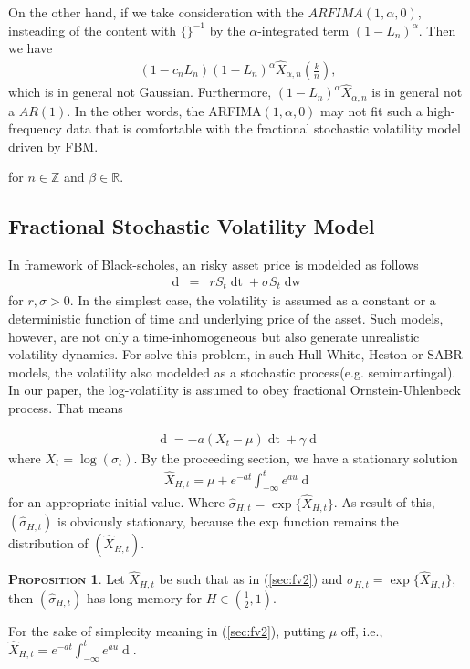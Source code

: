 \documentclass[a4paper, twoside, 11pt]{article}
\theoremstyle{definition}
\newtheorem{proposition}[definition]{\scshape Proposition}
\begin{document}
On the other hand, if we take consideration with the $ARFIMA(1, \alpha, 0)$, insteading of the content with $\{\}^{-1}$ by the $\alpha$-integrated term $(1-L_n)^\alpha$. Then we have
\begin{eqnarray*}
  (1-c_nL_n) (1-L_n)^\alpha \hat{X}_{\alpha,n}(\frac{k}{n}),
\end{eqnarray*}
which is in general not Gaussian. Furthermore, $(1-L_n)^\alpha \hat{X}_{\alpha,n}$ is in general not a $AR(1)$.  In the other words, the ARFIMA$(1, \alpha, 0)$ may not fit such a high-frequency data that is comfortable with the fractional stochastic volatility model driven by FBM. 


for $n \in \mathbb{Z}$ and $\beta \in \mathbb{R} $.
\subsection{Fractional Stochastic Volatility Model}
In framework of Black-scholes, an risky asset price is modelded as follows
\begin{eqnarray}
  \mathop{dS_t} &=& rS_t\mathop{dt} + \sigma S_t \mathop{dw}
\end{eqnarray}
for $r, \sigma > 0$. In the simplest case, the volatility is assumed as a constant or a deterministic function of time and underlying price of the asset. Such models, however, are not only a time-inhomogeneous but also generate unrealistic volatility dynamics. For solve this problem, in 
such  Hull-White, Heston or SABR models, the volatility also modelded as a stochastic process(e.g. semimartingal).\\
In our paper,  the log-volatility is assumed to obey fractional Ornstein-Uhlenbeck process. That means

\begin{eqnarray}
  \mathop{dX_t} = -a(X_t - \mu)\mathop{dt} + \gamma \mathop{dU_H(t)}
  \label{sec:fv}
\end{eqnarray}
where $X_t=\log(\sigma_t)$. By the proceeding section, we have a stationary solution 
\begin{eqnarray}
\hat{X}_{H,t}=\mu + e^{-at}\int_{-\infty}^t e^{au}\mathop{dU_H(u)}
\label{sec:fv2}
\end{eqnarray}
for an appropriate initial value.  Where $\hat{\sigma}_{H,t} = \exp\{\hat{X}_{H,t}\}$. As result of this, $(\hat{\sigma}_{H,t})$ is obviously stationary, because the exp function remains the distribution of $(\hat{X}_{H,t})$.
 
\begin{proposition}
  Let $\hat{X}_{H,t}$ be such that as in (\ref{sec:fv2}) and $\hat{\sigma}_{H,t} = \exp\{\hat{X}_{H,t}\}$, then $(\hat{\sigma}_{H,t})$ has long memory for $H\in(\frac{1}{2}, 1)$. 
\end{proposition}
For the sake of simplecity meaning in (\ref{sec:fv2}), putting $\mu$ off, i.e., $\hat{X}_{H,t}= e^{-at}\int_{-\infty}^t e^{au}\mathop{dU_H(u)}$.
\end{document}
